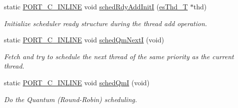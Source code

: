 \begin{DoxyCompactItemize}
static \hyperlink{group__template__compiler_ga87952d6e574c7f437503926e833ba345}{P\-O\-R\-T\-\_\-\-C\-\_\-\-I\-N\-L\-I\-N\-E} void \hyperlink{group__kern__impl_ga1317c12a1355ee8db4f104338f1df88d}{sched\-Rdy\-Add\-Init\-I} (\hyperlink{group__kern__thd_ga62e3a3ca0a4597a19c43cb8868810d82}{es\-Thd\-\_\-\-T} $\ast$thd)
\begin{DoxyCompactList}\small\item\em Initialize scheduler ready structure during the thread add operation. \end{DoxyCompactList}\item 
static \hyperlink{group__template__compiler_ga87952d6e574c7f437503926e833ba345}{P\-O\-R\-T\-\_\-\-C\-\_\-\-I\-N\-L\-I\-N\-E} void \hyperlink{group__kern__impl_ga56290a8f51b1d3babec91602292c8d61}{sched\-Qm\-Next\-I} (void)
\begin{DoxyCompactList}\small\item\em Fetch and try to schedule the next thread of the same priority as the current thread. \end{DoxyCompactList}\item 
static \hyperlink{group__template__compiler_ga87952d6e574c7f437503926e833ba345}{P\-O\-R\-T\-\_\-\-C\-\_\-\-I\-N\-L\-I\-N\-E} void \hyperlink{group__kern__impl_gaf57b17dda8d71ce9e7ef57ea0e7ef534}{sched\-Qm\-I} (void)
\begin{DoxyCompactList}\small\item\em Do the Quantum (Round-\/\-Robin) scheduling. \end{DoxyCompactList}\end{DoxyCompactItemize}
